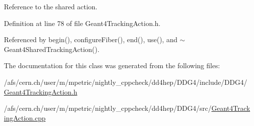 Reference to the shared action. 

Definition at line 78 of file Geant4TrackingAction.h.

Referenced by begin(), configureFiber(), end(), use(), and $\sim$Geant4SharedTrackingAction().

The documentation for this class was generated from the following files:\begin{DoxyCompactItemize}
\item 
/afs/cern.ch/user/m/mpetric/nightly\_\-cppcheck/dd4hep/DDG4/include/DDG4/\hyperlink{_geant4_tracking_action_8h}{Geant4TrackingAction.h}\item 
/afs/cern.ch/user/m/mpetric/nightly\_\-cppcheck/dd4hep/DDG4/src/\hyperlink{_geant4_tracking_action_8cpp}{Geant4TrackingAction.cpp}\end{DoxyCompactItemize}
